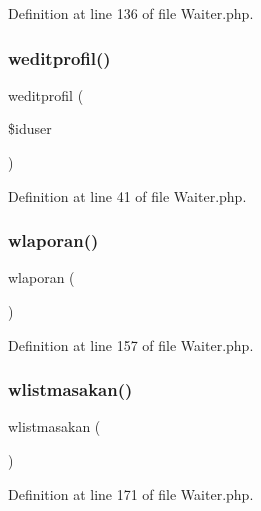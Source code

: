 Definition at line 136 of file Waiter.\+php.

\mbox{\label{class_waiter_a403ae80285a597d7e1e2a536d537b43d}} 
\subsubsection{\texorpdfstring{weditprofil()}{weditprofil()}}
{\footnotesize\ttfamily weditprofil (\begin{DoxyParamCaption}\item[{}]{\$iduser }\end{DoxyParamCaption})}



Definition at line 41 of file Waiter.\+php.

\mbox{\label{class_waiter_a198162d05e9335c26be4f79d1f1c1ea5}} 
\subsubsection{\texorpdfstring{wlaporan()}{wlaporan()}}
{\footnotesize\ttfamily wlaporan (\begin{DoxyParamCaption}{ }\end{DoxyParamCaption})}



Definition at line 157 of file Waiter.\+php.

\mbox{\label{class_waiter_aea86900f769335b2adb355aad479c428}} 
\subsubsection{\texorpdfstring{wlistmasakan()}{wlistmasakan()}}
{\footnotesize\ttfamily wlistmasakan (\begin{DoxyParamCaption}{ }\end{DoxyParamCaption})}



Definition at line 171 of file Waiter.\+php.

\mbox{\label{class_waiter_aec7c46990a078c2a25e5b3ba120d41c1}} 
